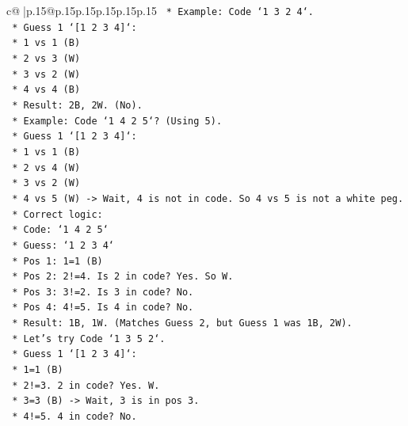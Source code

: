 \documentclass{article}
\begin{document}
{\begin{supertabular}{c@{$\;$}|p{.15\linewidth}@{}p{.15\linewidth}p{.15\linewidth}p{.15\linewidth}p{.15\linewidth}p{.15\linewidth}}
{{{\texttt{            *   Example: Code `1 3 2 4`.} \\
\texttt{                *   Guess 1 `{[}1 2 3 4{]}`:} \\
\texttt{                    *   1 vs 1 (B)} \\
\texttt{                    *   2 vs 3 (W)} \\
\texttt{                    *   3 vs 2 (W)} \\
\texttt{                    *   4 vs 4 (B)} \\
\texttt{                    *   Result: 2B, 2W. (No).} \\
\texttt{            *   Example: Code `1 4 2 5`? (Using 5).} \\
\texttt{                *   Guess 1 `{[}1 2 3 4{]}`:} \\
\texttt{                    *   1 vs 1 (B)} \\
\texttt{                    *   2 vs 4 (W)} \\
\texttt{                    *   3 vs 2 (W)} \\
\texttt{                    *   4 vs 5 (W) {-}> Wait, 4 is not in code. So 4 vs 5 is not a white peg.} \\
\texttt{                    *   Correct logic:} \\
\texttt{                        *   Code: `1 4 2 5`} \\
\texttt{                        *   Guess: `1 2 3 4`} \\
\texttt{                        *   Pos 1: 1=1 (B)} \\
\texttt{                        *   Pos 2: 2!=4. Is 2 in code? Yes. So W.} \\
\texttt{                        *   Pos 3: 3!=2. Is 3 in code? No.} \\
\texttt{                        *   Pos 4: 4!=5. Is 4 in code? No.} \\
\texttt{                        *   Result: 1B, 1W. (Matches Guess 2, but Guess 1 was 1B, 2W).} \\
\texttt{            *   Let's try Code `1 3 5 2`.} \\
\texttt{                *   Guess 1 `{[}1 2 3 4{]}`:} \\
\texttt{                    *   1=1 (B)} \\
\texttt{                    *   2!=3. 2 in code? Yes. W.} \\
\texttt{                    *   3=3 (B) {-}> Wait, 3 is in pos 3.} \\
\texttt{                    *   4!=5. 4 in code? No.} \\
}}}
\end{supertabular}}
\end{document}
